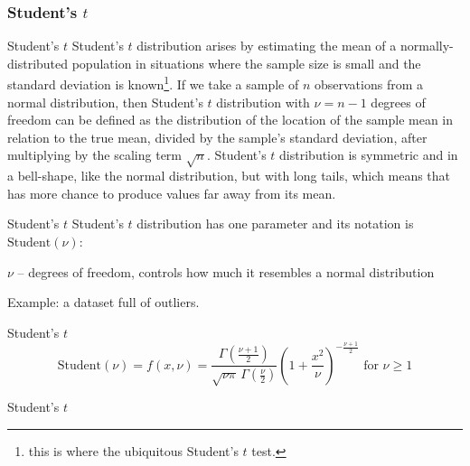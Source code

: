 \subsubsection{Student's $t$}
\begin{frame}{Student's $t$}
	Student's $t$ distribution arises by estimating the mean of a normally-distributed
	population in situations where the sample size is small and the standard
	deviation is known\footnote{this is where the ubiquitous Student's $t$ test.}.
	\vfill
	If we take a sample of $n$ observations from a normal distribution,
	then Student's $t$ distribution with $\nu = n-1$ degrees of freedom can
	be defined as the distribution of the location of the sample mean
	in relation to the true mean, divided by the sample's standard deviation,
	after multiplying by the scaling term $\sqrt{n}$.
	\vfill
	Student's $t$ distribution is symmetric and in a bell-shape,
	like the normal distribution, but with long tails,
	which means that has more chance to produce values far away from its mean.
\end{frame}

\begin{frame}{Student's $t$}
	Student's $t$ distribution has one parameter and its notation is
	$\text{Student}(\nu)$:
	\begin{vfilleditems}
		\item $\nu$ -- degrees of freedom, controls how much it resembles a normal distribution
	\end{vfilleditems}
	\vfill
	Example: a dataset full of outliers.
\end{frame}

\begin{frame}{Student's $t$}
	$$\text{Student}(\nu) = f(x, \nu) = \frac{\Gamma \left(\frac{\nu+1}{2} \right)} {\sqrt{\nu\pi}\,\Gamma \left(\frac{\nu}{2} \right)} \left(1+\frac{x^2}{\nu} \right)^{-\frac{\nu+1}{2}} \text{ for $\nu \geq 1$}$$
\end{frame}

\begin{frame}{Student's $t$}
	\centering
\end{frame}


